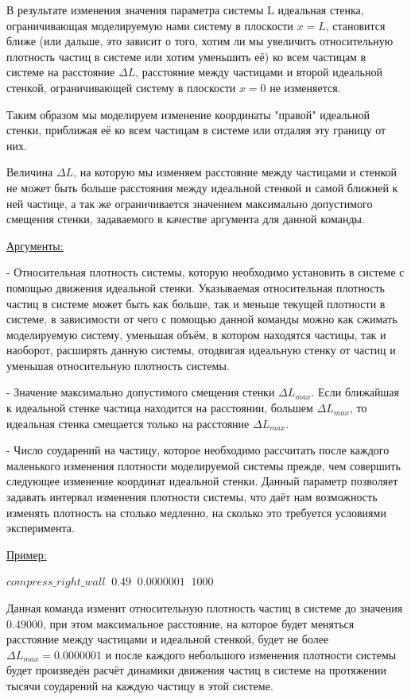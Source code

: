 \documentclass[a4paper]{article}
\begin{document}
В результате изменения значения параметра системы L идеальная стенка, ограничивающая моделируемую нами систему в плоскости $ x = L $, становится ближе (или дальше, это зависит о того, хотим ли мы увеличить относительную плотность частиц в системе или хотим уменьшить её) ко всем частицам в системе на расстояние $ \Delta L $, расстояние между частицами и второй идеальной стенкой, ограничивающей систему в плоскости $ x = 0 $ не изменяется.

Таким образом мы моделируем изменение координаты "правой" идеальной стенки, приближая её ко всем частицам в системе или отдаляя эту границу от них.

Величина $ \Delta L $, на которую мы изменяем расстояние между частицами и стенкой не может быть больше расстояния между идеальной стенкой и самой ближней к ней частице, а так же ограничивается значением максимально допустимого смещения стенки, задаваемого в качестве аргумента для данной команды.

\uline{Аргументы:}

- Относительная плотность системы, которую необходимо установить в системе с помощью движения идеальной стенки. Указываемая относительная плотность частиц в системе может быть как больше, так и меньше текущей плотности в системе, в зависимости от чего с помощью данной команды можно как сжимать моделируемую систему, уменьшая объём, в котором находятся частицы, так и наоборот, расширять данную системы, отодвигая идеальную стенку от частиц и уменьшая относительную плотность системы.

- Значение максимально допустимого смещения стенки $ \Delta L_{max} $. Если ближайшая к идеальной стенке частица находится на расстоянии, большем $ \Delta L_{max} $, то идеальная стенка смещается только на расстояние $ \Delta L_{max} $.

- Число соударений на частицу, которое необходимо рассчитать после каждого маленького изменения плотности моделируемой системы прежде, чем совершить следующее изменение координат идеальной стенки. Данный параметр позволяет задавать интервал изменения плотности системы, что даёт нам возможность изменять плотность на столько медленно, на сколько  это требуется условиями эксперимента.

\uline{Пример:}

$ compress\_right\_wall \;\; 0.49 \;\; 0.0000001 \;\; 1000 $

Данная команда изменит относительную плотность частиц в системе до значения $ 0.49000 $, при этом максимальное расстояние, на которое будет меняться расстояние между частицами и идеальной стенкой, будет не более $ \Delta L_{max} = 0.0000001 $ и после каждого небольшого изменения плотности системы будет произведён расчёт динамики движения частиц в системе на протяжении тысячи соударений на каждую частицу в этой системе.
\end{document}
